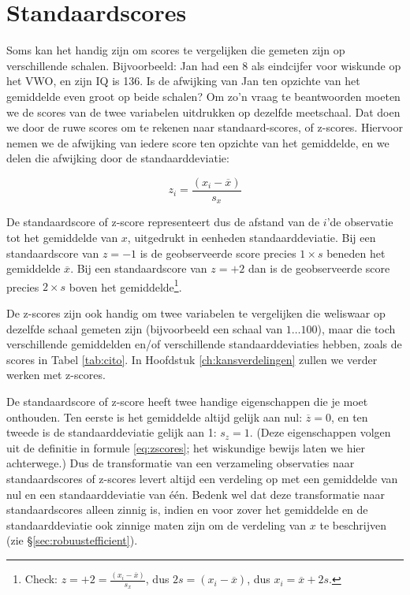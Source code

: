 \documentclass[
]{book}
\begin{document}
\hypertarget{sec:standaardscores}{%
\section{Standaardscores}\label{sec:standaardscores}}

Soms kan het handig zijn om scores te vergelijken die gemeten zijn op
verschillende schalen. Bijvoorbeeld: Jan had een 8 als eindcijfer voor
wiskunde op het VWO, en zijn IQ is 136. Is de afwijking van Jan ten
opzichte van het gemiddelde even groot op beide schalen? Om zo'n vraag
te beantwoorden moeten we de scores van de twee variabelen uitdrukken op
dezelfde meetschaal. Dat doen we door de ruwe scores om te rekenen naar
standaard-scores, of z-scores. Hiervoor nemen we de afwijking van iedere
score ten opzichte van het gemiddelde, en we delen die afwijking door de
standaarddeviatie:

\begin{equation}
    z_i = \frac{(x_i-\overline{x})}{s_x}
   \label{eq:zscores}
\end{equation}

De standaardscore of z-score
representeert dus de afstand van de \(i\)'de observatie tot het gemiddelde
van \(x\), uitgedrukt in eenheden standaarddeviatie. Bij een
standaardscore van \(z=-1\) is de geobserveerde score precies \(1 \times s\)
beneden het gemiddelde \(\overline{x}\). Bij een standaardscore van \(z=+2\)
dan is de geobserveerde score precies \(2 \times s\) boven het
gemiddelde\footnote{Check: \(z = +2 = \frac{(x_i-\overline{x})}{s_x}\), dus \(2 s = (x_i-\overline{x})\), dus \(x_i = \overline{x}+2s\).}.

De z-scores zijn ook handig om twee variabelen te vergelijken die
weliswaar op dezelfde schaal gemeten zijn (bijvoorbeeld een schaal van
\(1 \dots 100\)), maar die toch verschillende gemiddelden en/of
verschillende standaarddeviaties hebben, zoals de scores in
Tabel \ref{tab:cito}.
In Hoofdstuk \ref{ch:kansverdelingen} zullen we verder werken met z-scores.

De standaardscore of z-score heeft twee handige eigenschappen die je
moet onthouden. Ten eerste is het gemiddelde altijd gelijk aan nul:
\(\overline{z}=0\), en ten tweede is de standaarddeviatie gelijk aan 1:
\(s_z = 1\). (Deze eigenschappen volgen uit de definitie in
formule \eqref{eq:zscores}; het wiskundige bewijs laten we hier
achterwege.) Dus de transformatie van een verzameling observaties naar
standaardscores of z-scores levert altijd een verdeling op met een
gemiddelde van nul en een standaarddeviatie van één. Bedenk wel dat deze
transformatie naar standaardscores alleen zinnig is, indien en voor
zover het gemiddelde en de standaarddeviatie ook zinnige maten zijn om
de verdeling van \(x\) te beschrijven (zie §\ref{sec:robuustefficient}).
\end{document}
